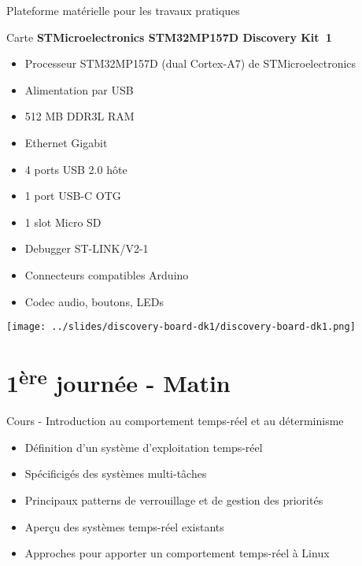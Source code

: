 \documentclass[a4paper,12pt,obeyspaces,spaces,hyphens]{article}
\begin{document}
\feshowtitle

\certificate{}
\disabilities{}

\feagendatwocolumn
{Plateforme matérielle pour les travaux pratiques}
{
  Carte {\bf STMicroelectronics STM32MP157D Discovery Kit~1}
  \begin{itemize}
  \item Processeur STM32MP157D (dual Cortex-A7) de STMicroelectronics
  \item Alimentation par USB
  \item 512 MB DDR3L RAM
  \item Ethernet Gigabit
  \item 4 ports USB 2.0 hôte
  \item 1 port USB-C OTG
  \item 1 slot Micro SD
  \item Debugger ST-LINK/V2-1
  \item Connecteurs compatibles Arduino
  \item Codec audio, boutons, LEDs
  \end{itemize}
}
{}
{
  \begin{center}
    \texttt{[image: ../slides/discovery-board-dk1/discovery-board-dk1.png]}
  \end{center}
}

\section{1\textsuperscript{ère} journée - Matin}

\feagendaonecolumn
{Cours - Introduction au comportement temps-réel et au déterminisme}
{
  \begin{itemize}
  \item Définition d'un système d'exploitation temps-réel
  \item Spécificigés des systèmes multi-tâches
  \item Principaux patterns de verrouillage et de gestion des priorités
  \item Aperçu des systèmes temps-réel existants
  \item Approches pour apporter un comportement temps-réel à Linux
  \end{itemize}
}
\end{document}
